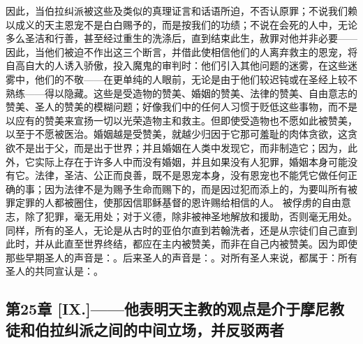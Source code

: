 因此，当伯拉纠派被这些及类似的真理证言和话语所迫，不否认原罪；不说我们赖以成义的天主恩宠不是白白赐予的，而是按我们的功绩；不说在会死的人中，无论多么圣洁和行善，甚至经过重生的洗涤后，直到结束此生，赦罪对他并非必要——因此，当他们被迫不作出这三个断言，并借此使相信他们的人离弃救主的恩宠，将自高自大的人诱入骄傲，投入魔鬼的审判时：他们引入其他问题的迷雾，在这些迷雾中，他们的不敬——在更单纯的人眼前，无论是由于他们较迟钝或在圣经上较不熟练——得以隐藏。这些是受造物的赞美、婚姻的赞美、法律的赞美、自由意志的赞美、圣人的赞美的模糊问题；好像我们中的任何人习惯于贬低这些事物，而不是以应有的赞美来宣扬一切以光荣造物主和救主。但即使受造物也不愿如此被赞美，以至于不愿被医治。婚姻越是受赞美，就越少归因于它那可羞耻的肉体贪欲，这贪欲不是出于父，而是出于世界；并且婚姻在人类中发现它，而非制造它；因为，此外，它实际上存在于许多人中而没有婚姻，并且如果没有人犯罪，婚姻本身可能没有它。法律，圣洁、公正而良善，既不是恩宠本身，没有恩宠也不能凭它做任何正确的事；因为法律不是为赐予生命而赐下的，而是因过犯而添上的，为要叫所有被罪定罪的人都被圈住，使那因信耶稣基督的恩许赐给相信的人。 被俘虏的自由意志，除了犯罪，毫无用处；对于义德，除非被神圣地解放和援助，否则毫无用处。同样，所有的圣人，无论是从古时的亚伯尔直到若翰洗者，还是从宗徒们自己直到此时，并从此直至世界终结，都应在主内被赞美，而非在自己内被赞美。因为即使那些早期圣人的声音是：。后来圣人的声音是：。对所有圣人来说，都属于：所有圣人的共同宣认是：。\par


\subsection{第25章 [IX.]——他表明天主教的观点是介于摩尼教徒和伯拉纠派之间的中间立场，并反驳两者}

